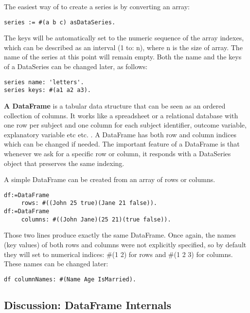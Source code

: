 \documentclass[sigplan]{acmart}
\makeatletter
\newcommand*{\etc}{%
    \@ifnextchar{.}%
        {etc}%
        {etc.\@\xspace}%
}
\makeatother
\begin{document}
The easiest way of to create a series is by converting an array: 

\begin{lstlisting}[basicstyle=\small,language=Smalltalk]
series := #(a b c) asDataSeries.
\end{lstlisting}

The keys will be automatically set to the numeric sequence of the array indexes, which can be described as an interval (1 to: n), where n is the size of array. The name of the series at this point will remain empty. Both the name and the keys of a DataSeries can be changed later, as follows:

\begin{lstlisting}[basicstyle=\small,language=Smalltalk]
series name: 'letters'.
series keys: #(a1 a2 a3).
\end{lstlisting}

\textbf{A DataFrame} is a tabular data structure that can be seen as an ordered collection of columns. It works like a spreadsheet or a relational database with one row per subject and one column for each subject identifier, outcome variable, explanatory variable \etc. A DataFrame has both row and column indices which can be changed if needed. The important feature of a DataFrame is that whenever we ask for a specific row or column, it responds with a DataSeries object that preserves the same indexing.

A simple DataFrame can be created from an array of rows or columns.

\begin{lstlisting}[basicstyle=\small,language=Smalltalk]
df:=DataFrame 
     rows: #((John 25 true)(Jane 21 false)).
df:=DataFrame 
     columns: #((John Jane)(25 21)(true false)).
\end{lstlisting}

Those two lines produce exactly the same DataFrame. Once again, the names (key values) of both rows and columns were not explicitly specified, so by default they will set to numerical indices: \#(1 2) for rows and \#(1 2 3) for columns. These names can be changed later:

\begin{lstlisting}[basicstyle=\small,language=Smalltalk]
df columnNames: #(Name Age IsMarried).
\end{lstlisting}

\subsection{Discussion: DataFrame Internals}
\label{sec:internals}
\end{document}
